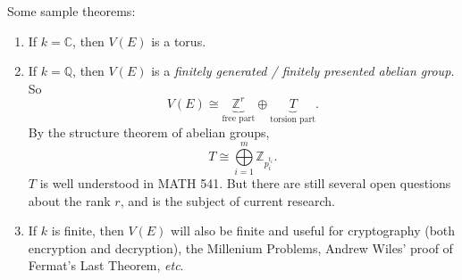 \documentclass[12pt]{article}
\newcommand{\z}{\mathbb{Z}}
\newcommand{\q}{\mathbb{Q}}
\newcommand{\cx}{\mathbb{C}}
\newcommand{\ita}[1]{\textit{#1}}
\theoremstyle{definition}
\begin{document}
Some sample theorems:
\begin{enumerate}
    \item If $k=\cx$, then $V(E)$ is a torus.
    \item If $k=\q$, then $V(E)$ is a \ita{finitely generated / finitely presented abelian group.} So
    \begin{equation}
        V(E)\cong\underbrace{\z^r}_{\text{free part}}\oplus\underbrace{T}_{\text{torsion part}}.
    \end{equation}
    By the structure theorem of abelian groups, 
    \begin{equation}
        T\cong\bigoplus\limits_{i=1}^m\z_{p_i^{t_i}}.
    \end{equation}
    $T$ is well understood in MATH 541. But there are still several open questions about the rank $r$, and is the subject of current research.
    \item If $k$ is finite, then $V(E)$ will also be finite and useful for cryptography (both encryption and decryption), the Millenium Problems, Andrew Wiles' proof of Fermat's Last Theorem, \ita{etc}.
\end{enumerate}
\end{document}
